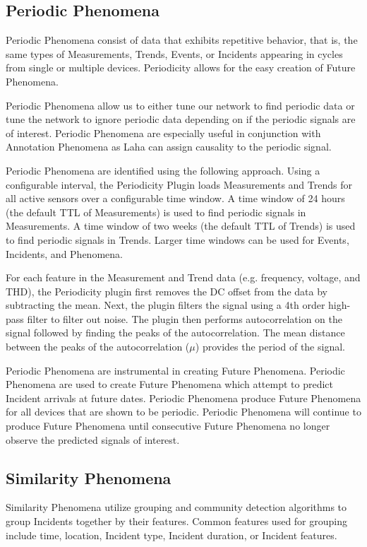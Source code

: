 \subsection{Periodic Phenomena} \label{subsec:periodicity-phenomena}
Periodic Phenomena consist of data that exhibits repetitive behavior, that is, the same types of Measurements, Trends, Events, or Incidents appearing in cycles from single or multiple devices. Periodicity allows for the easy creation of Future Phenomena.

Periodic Phenomena allow us to either tune our network to find periodic data or tune the network to ignore periodic data depending on if the periodic signals are of interest. Periodic Phenomena are especially useful in conjunction with Annotation Phenomena as Laha can assign causality to the periodic signal.

Periodic Phenomena are identified using the following approach. Using a configurable interval, the Periodicity Plugin loads Measurements and Trends for all active sensors over a configurable time window. A time window of 24 hours (the default TTL of Measurements) is used to find periodic signals in Measurements. A time window of two weeks (the default TTL of Trends) is used to find periodic signals in Trends. Larger time windows can be used for Events, Incidents, and Phenomena.

For each feature in the Measurement and Trend data (e.g. frequency, voltage, and THD), the Periodicity plugin first removes the DC offset from the data by subtracting the mean. Next, the plugin filters the signal using a 4th order high-pass filter to filter out noise. The plugin then performs autocorrelation on the signal followed by finding the peaks of the autocorrelation. The mean distance between the peaks of the autocorrelation ($\mu$) provides the period of the signal.

Periodic Phenomena are instrumental in creating Future Phenomena. Periodic Phenomena are used to create Future Phenomena which attempt to predict Incident arrivals at future dates. Periodic Phenomena produce Future Phenomena for all devices that are shown to be periodic. Periodic Phenomena will continue to produce Future Phenomena until consecutive Future Phenomena no longer observe the predicted signals of interest.

\subsection{Similarity Phenomena}\label{subsec:similarity-phenomena}
Similarity Phenomena utilize grouping and community detection algorithms to group Incidents together by their features. Common features used for grouping include time, location, Incident type, Incident duration, or Incident features.

